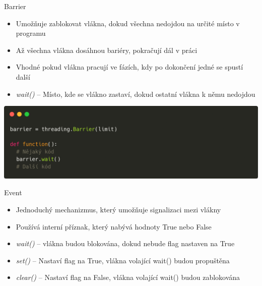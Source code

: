 \documentclass{beamer}
\begin{document}
\begin{frame}[fragile]{Barrier}
    \begin{itemize}
        \item Umožňuje zablokovat vlákna, dokud všechna nedojdou na určité místo v programu
        \item Až všechna vlákna dosáhnou bariéry, pokračují dál v práci
        \item Vhodné pokud vlákna pracují ve fázích, kdy po dokončení jedné se spustí další

        \vskip 0.25in
        \item \textit{wait()} – Místo, kde se vlákno zastaví, dokud ostatní vlákna k němu nedojdou
    \end{itemize}
    \scriptsize

    \begin{center}
        \includegraphics[width=\textwidth]{obrazky/codes/carbon4.png}
    \end{center}
\end{frame}

\begin{frame}{Event}
    \begin{itemize}
        \item Jednoduchý mechanizmus, který umožňuje signalizaci mezi vlákny
        \item Používá interní příznak, který nabývá hodnoty True nebo False
        \vskip 0.25in

        \item \textit{wait()} – vlákna budou blokována, dokud nebude flag nastaven na True
        \item \textit{set()} – Nastaví flag na True, vlákna volající wait() budou propuštěna
        \item \textit{clear()} – Nastaví flag na False, vlákna volající wait() budou zablokována
    \end{itemize}
\end{frame}
\end{document}
